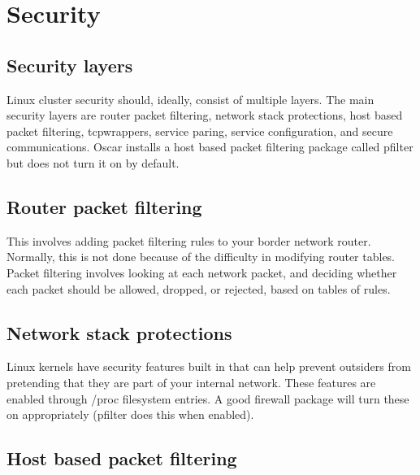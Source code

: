 %
%
%

\section{Security}
\label{app:security}

\subsection{Security layers}
Linux cluster security should, ideally, consist of multiple layers.
The main security layers are router packet filtering, 
network stack protections, host based packet filtering, tcpwrappers,
service paring, service configuration, and secure communications.
Oscar installs a host based packet filtering package called pfilter
but does not turn it on by default.

\subsection{Router packet filtering}

This involves adding packet filtering rules to your border network router.
Normally, this is not done because of the difficulty in modifying router
tables. Packet filtering involves looking at each network packet,
and deciding whether each packet should be allowed, dropped, or rejected,
based on tables of rules.

\subsection{Network stack protections}

Linux kernels have security features built in that can help prevent 
outsiders from pretending that they are part of your internal network.
These features are enabled through /proc filesystem entries.
A good firewall package will turn these on appropriately
(pfilter does this when enabled).

\subsection{Host based packet filtering}

